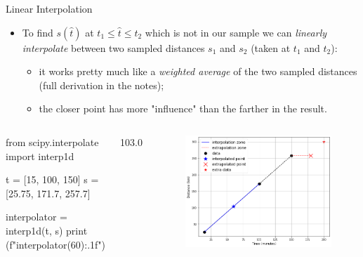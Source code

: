 \documentclass{beamer}
\begin{document}
\begin{frame}[fragile]{Linear Interpolation}
  \begin{itemize}
  \item To find $s(\hat{t})$ at $t_1 \leq \hat{t} \leq t_2$ which is not in our sample we can \emph{linearly interpolate} between two sampled distances $s_1$ and $s_2$ (taken at $t_1$ and $t_2$):
    \begin{itemize}
    \item it works pretty much like a \emph{weighted average} of the two sampled distances (full derivation in the notes);
    \item the closer point has more "influence" than the farther in the result.
    \end{itemize}
  \end{itemize}
  \begin{columns}
  \begin{ipython}
from scipy.interpolate import interp1d

t = [15, 100, 150]
s = [25.75, 171.7, 257.7]

interpolator = interp1d(t, s)
print (f"{interpolator(60):.1f}")
\end{ipython}
\begin{ioutput}
103.0
\end{ioutput}
    \begin{figure}[h]	
        \begin{center}
        \includegraphics[width=0.85\linewidth]{interp2}
        \end{center}
    \end{figure}
  \end{columns}
\end{frame}
\end{document}
